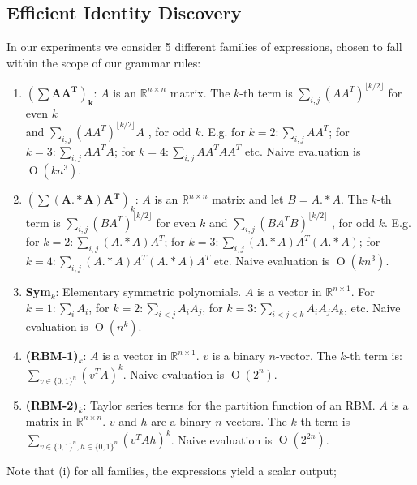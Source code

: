 \documentclass{article} %
\newcommand{\BigO}[1]{\ensuremath{\operatorname{O}\left(#1\right)}}
\begin{document}
\subsection{Efficient Identity Discovery}
\label{sec:results}
In our experiments we consider 5 different families of expressions,
chosen to fall within the scope of our grammar rules: 
\vspace{-2mm}
\begin{enumerate}
  \item {$\mathbf{(\sum AA^T)_k}$:} $A$ is an $\mathbb{R}^{n \times
      n}$ matrix. The $k$-th term is $\sum_{i,j}
    (AA^T)^{\lfloor k/2\rfloor}$ for even $k$ \\ and $\sum_{i,j}
    (AA^T)^{\lfloor k/2\rfloor}A$ , for odd $k$.  E.g. for $k=2: \sum_{i,j} AA^T$;
    for $k=3: \sum_{i,j} AA^TA$; for $k=4: \sum_{i, j} AA^TAA^T$
    etc. Naive evaluation is $\BigO{kn^3}$.
\vspace{-1mm}
  \item {$(\mathbf{\sum (A.*A)A^T})_k$:} $A$ is an $\mathbb{R}^{n \times
      n}$ matrix and let $B = A.*A$. The $k$-th term is $\sum_{i,j}
    (BA^T)^{\lfloor k/2\rfloor}$ for even $k$ and $\sum_{i,j}
    (BA^TB)^{\lfloor k/2\rfloor}$ , for odd $k$.  E.g. for $k=2: \sum_{i,j} (A.*A)A^T$;
    for $k=3: \sum_{i,j} (A.*A)A^T(A.*A)$; for $k=4: \sum_{i, j}(A.*A)A^T(A.*A)A^T$
    etc. Naive evaluation is $\BigO{kn^3}$.
\vspace{-1mm}
 \item {\bf Sym$_k$}: Elementary symmetric polynomials. $A$ is a
   vector in $\mathbb{R}^{n \times 1}$.  For $k=1: \sum_{i}A_i$, for $k=2:
   \sum_{i<j}A_iA_j$, for $k=3: \sum_{i<j<k}A_iA_jA_k$, etc. Naive
   evaluation is $\BigO{n^k}$. 
\vspace{-1mm}
  \item {\bf (RBM-1)$_k$}: $A$ is a vector in $\mathbb{R}^{n \times 1}$. $v$ is
    a binary $n$-vector. The $k$-th term is: $\sum_{v \in \{0, 1\}^n}
    (v^T A)^k$. Naive evaluation is $\BigO{2^n}$.
\vspace{-1mm}
  \item {\bf (RBM-2)$_k$}: Taylor series terms for the partition
    function of an RBM. $A$ is a matrix in $\mathbb{R}^{n \times
    n}$. $v$ and $h$ are a binary $n$-vectors. The $k$-th term is $\sum_{v \in \{0,1\}^n,h \in \{0, 1\}^n} (v^TAh)^k$. Naive evaluation is $\BigO{2^{2n}}$.
\end{enumerate}
\vspace{-1mm}
Note that (i) for all families, the expressions yield a scalar output;
\end{document}

